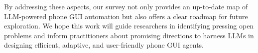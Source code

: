 By addressing these aspects, our survey not only provides an up-to-date map of LLM-powered phone GUI automation but also offers a clear roadmap for future exploration. We hope this work will guide researchers in identifying pressing open problems and inform practitioners about promising directions to harness LLMs in designing efficient, adaptive, and user-friendly phone GUI agents.
